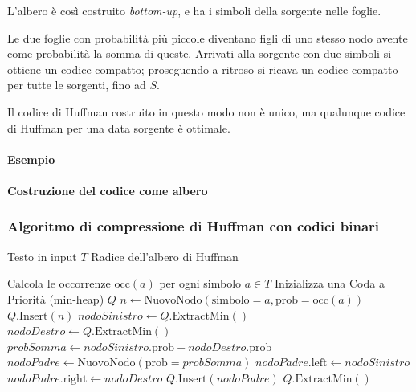 L'albero è così costruito \textit{bottom-up}, e ha i simboli della sorgente nelle foglie.

Le due foglie con probabilità più piccole diventano figli di uno stesso nodo avente come probabilità la somma di queste. Arrivati alla sorgente con due simboli si ottiene un codice compatto; proseguendo a ritroso si ricava un codice compatto per tutte le sorgenti, fino ad $S$.

Il codice di Huffman costruito in questo modo non è unico, ma qualunque codice di Huffman per una data sorgente è ottimale.

\paragraph{Esempio}

\paragraph{Costruzione del codice come albero}

\subsubsection{Algoritmo di compressione di Huffman con codici binari}
\begin{algorithm}
\caption{Costruzione Albero di Huffman}
\begin{algorithmic}[1]
\Require Testo in input $T$
\Ensure Radice dell'albero di Huffman

\State Calcola le occorrenze $\mathrm{occ}(a)$ per ogni simbolo $a \in T$
\State Inizializza una Coda a Priorità (min-heap) $Q$
\Statex 
{}
    \State $n \gets \text{NuovoNodo}(\text{simbolo}=a, \text{prob}=\mathrm{occ}(a))$
    \State $Q.\text{Insert}(n)$
\EndFor
\Statex
{}
    \State $nodoSinistro \gets Q.\text{ExtractMin}()$
    \State $nodoDestro \gets Q.\text{ExtractMin}()$
    \Statex
    \State $probSomma \gets nodoSinistro.\text{prob} + nodoDestro.\text{prob}$
    \State $nodoPadre \gets \text{NuovoNodo}(\text{prob}=probSomma)$
    \State $nodoPadre.\text{left} \gets nodoSinistro$
    \State $nodoPadre.\text{right} \gets nodoDestro$
    \Statex
    \State $Q.\text{Insert}(nodoPadre)$
\EndWhile
\Statex
\State \Return $Q.\text{ExtractMin}()$ 
\end{algorithmic}
\end{algorithm}


